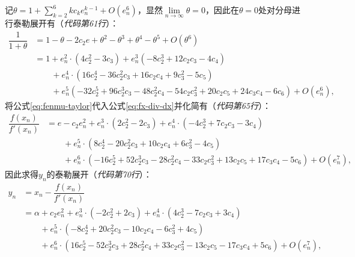 记$\theta = 1 + \sum\limits_{k=2}^6 kc_ke_n^{k-1} + O(e_n^6) $，显然$\lim\limits_{n\to \infty}\theta = 0$，因此在$\theta = 0$处对分母进行泰勒展开有（\textit{代码第61行}）：
\begin{equation}
    \label{eq:fenmu-taylor}
    \begin{aligned}
        \dfrac{1}{1+\theta} &= 1 - \theta - 2 c_{2} e + \theta^2 - \theta^3 + \theta^4 - \theta^5 + O(\theta^6) \\
        &= 1 + e_n^{2} \cdot \left(4 c_{2}^{2} - 3 c_{3}\right) + e_n^{3} \left(- 8 c_{2}^{3} + 12 c_{2} c_{3} - 4 c_{4}\right) \\
        &\qquad + e_n^{4} \cdot \left(16 c_{2}^{4} - 36 c_{2}^{2} c_{3} + 16 c_{2} c_{4} + 9 c_{3}^{2} - 5 c_{5}\right) \\
        &\qquad + e_n^{5} \left(- 32 c_{2}^{5} + 96 c_{2}^{3} c_{3} - 48 c_{2}^{2} c_{4} - 54 c_{2} c_{3}^{2} + 20 c_{2} c_{5} + 24 c_{3} c_{4} - 6 c_{6}\right) + O\left(e_n^{6}\right),
    \end{aligned}
\end{equation}
将公式\ref{eq:fenmu-taylor}代入公式\ref{eq:fx-div-dx}并化简有（\textit{代码第65行}）：
\begin{equation}
    \begin{aligned}
        \dfrac{f(x_n)}{f'(x_n)} &= e - c_{2} e_n^{2} + e_n^{3} \cdot \left(2 c_{2}^{2} - 2 c_{3}\right) + e_n^{4} \cdot \left(- 4 c_{2}^{3} + 7 c_{2} c_{3} - 3 c_{4}\right) \\
        &\qquad + e_n^{5} \cdot \left(8 c_{2}^{4} - 20 c_{2}^{2} c_{3} + 10 c_{2} c_{4} + 6 c_{3}^{2} - 4 c_{5}\right) \\
        &\qquad + e_n^{6} \cdot \left(- 16 c_{2}^{5} + 52 c_{2}^{3} c_{3} - 28 c_{2}^{2} c_{4} - 33 c_{2} c_{3}^{2} + 13 c_{2} c_{5} + 17 c_{3} c_{4} - 5 c_{6}\right) + O\left(e_n^{7}\right),
    \end{aligned}
\end{equation}
因此求得$y_n$的泰勒展开（\textit{代码第70行}）：
\begin{equation}
    \label{eq:taylor-y}
    \begin{aligned}
        y_n &= x_n - \dfrac{f(x_n)}{f'(x_n)}\\
        &= \alpha + c_{2} e_n^{2} + e_n^{3} \cdot \left(- 2 c_{2}^{2} + 2 c_{3}\right) + e_n^{4} \cdot \left(4 c_{2}^{3} - 7 c_{2} c_{3} + 3 c_{4}\right) \\
        &\qquad + e_n^{5} \cdot \left(- 8 c_{2}^{4} + 20 c_{2}^{2} c_{3} - 10 c_{2} c_{4} - 6 c_{3}^{2} + 4 c_{5}\right) \\
        &\qquad + e_n^{6} \cdot \left(16 c_{2}^{5} - 52 c_{2}^{3} c_{3} + 28 c_{2}^{2} c_{4} + 33 c_{2} c_{3}^{2} - 13 c_{2} c_{5} - 17 c_{3} c_{4} + 5 c_{6}\right) + O\left(e_n^{7}\right),
    \end{aligned}
\end{equation}
